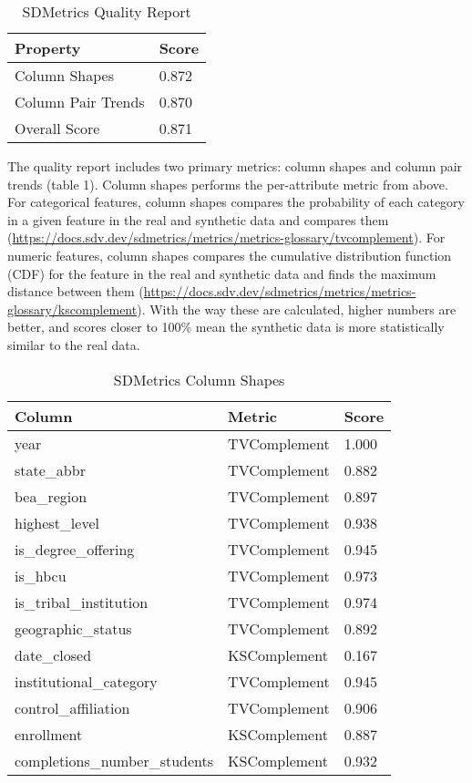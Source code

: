 \documentclass[sigconf, authorversion, nonacm]{acmart}
\begin{document}
    \begin{table}
        \caption{SDMetrics Quality Report}
        \begin{tabular}{ll}
            \toprule
            Property & Score\\
            \midrule
            Column Shapes & 0.872 \\
            Column Pair Trends & 0.870 \\
            Overall Score & 0.871 \\
            \bottomrule
        \end{tabular}
    \end{table}

    The quality report includes two primary metrics: column shapes and column pair trends (table 1). Column shapes performs the per-attribute metric from above. For categorical features, column shapes compares the probability of each category in a given feature in the real and synthetic data and compares them (\href{https://docs.sdv.dev/sdmetrics/metrics/metrics-glossary/tvcomplement}{https://docs.sdv.dev/sdmetrics/metrics/metrics-glossary/tvcomplement}). For numeric features, column shapes compares the cumulative distribution function (CDF) for the feature in the real and synthetic data and finds the maximum distance between them (\href{https://docs.sdv.dev/sdmetrics/metrics/metrics-glossary/kscomplement}{https://docs.sdv.dev/sdmetrics/metrics/metrics-glossary/kscomplement}). With the way these are calculated, higher numbers are better, and scores closer to 100\% mean the synthetic data is more statistically similar to the real data.

    \begin{table}
        \caption{SDMetrics Column Shapes}
        \begin{tabular}{lll}
            \toprule
            Column & Metric & Score \\
            \midrule
            year & TVComplement & 1.000 \\
            state\_abbr & TVComplement & 0.882 \\
            bea\_region & TVComplement & 0.897 \\
            highest\_level & TVComplement & 0.938 \\
            is\_degree\_offering & TVComplement & 0.945 \\
            is\_hbcu & TVComplement & 0.973 \\
            is\_tribal\_institution & TVComplement & 0.974 \\
            geographic\_status & TVComplement & 0.892 \\
            date\_closed & KSComplement & 0.167 \\
            institutional\_category & TVComplement & 0.945 \\
            control\_affiliation & TVComplement & 0.906 \\
            enrollment & KSComplement & 0.887 \\
            completions\_number\_students & KSComplement & 0.932 \\
            \bottomrule
        \end{tabular}
    \end{table}
\end{document}
